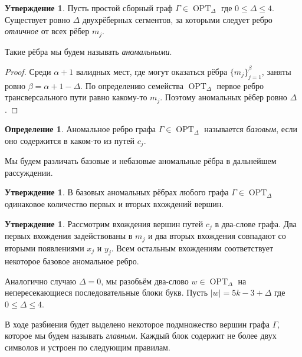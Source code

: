 \documentclass{article}
\theoremstyle{definition}
\newtheorem{conjecture}[theorem]{Утверждение}
\newtheorem{definition}[theorem]{Определение}
\newcommand{\OPT}{\operatorname{OPT}}
\newcommand{\D}{\Delta}
\begin{document}
\begin{conjecture}
    Пусть простой сборный граф $\Gamma \in \OPT_\D$ где $0 \leq \D \leq 4$. Существует ровно $\D$ двухрёберных сегментов, за которыми следует ребро \emph{отличное} от всех рёбер $m_j$.
\end{conjecture}

Такие рёбра мы будем называть \emph{аномальными}.
\begin{proof}
    Среди $\alpha + 1$ валидных мест, где могут оказаться рёбра $\{m_j\}_{j = 1}^\beta$, заняты ровно $\beta = \alpha + 1 - \D$. По определению семейства $\OPT_\D$ первое ребро трансверсального пути равно какому-то $m_j$. Поэтому аномальных рёбер ровно $\D$.
\end{proof}

\begin{definition}
    Аномальное ребро графа $\Gamma \in \OPT_\D$ называется \emph{базовым}, если оно содержится в каком-то из путей $c_j$.
\end{definition}

Мы будем различать базовые и небазовые аномальные рёбра в дальнейшем рассуждении.

\begin{conjecture}
    В базовых аномальных рёбрах любого графа $\Gamma \in \OPT_\D$ одинаковое количество первых и вторых вхождений вершин.
\end{conjecture}

\begin{conjecture}
    Рассмотрим вхождения вершин путей $c_j$ в два-слове графа. Два первых вхождения задействованы в $m_j$ и два вторых вхождения совпадают со вторыми появлениями $x_j$ и $y_j$. Всем остальным вхождениям соответствует некоторое базовое аномальное ребро.
\end{conjecture}

Аналогично случаю $\D = 0$, мы разобьём два-слово $w \in \OPT_\D$ на непересекающиеся последовательные блоки букв. Пусть $|w| = 5k - 3  + \D$ где $0 \leq \D \leq 4$.

В ходе разбиения будет выделено некоторое подмножество вершин графа \(\Gamma\), которое мы будем называть \emph{главным}. Каждый блок содержит не более двух символов и устроен по следующим правилам.
\end{document}
